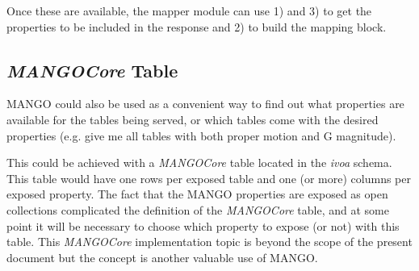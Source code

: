 Once these are available, the mapper module can use 1) and 3) to get the properties to be included 
in the response and 2) to build the mapping block. 

\subsection{ \emph{MANGOCore} Table}

MANGO could also be used as a convenient way to find out what properties are available for the tables being served,
or which tables come with the desired properties (e.g. give me all tables with both proper motion and G magnitude).

This could be achieved with a \emph{MANGOCore} table located in the \emph{ivoa} schema. 
This table would have one rows per exposed table and one (or more) columns per exposed property.
The fact that the MANGO properties are exposed as open collections complicated the definition 
of the \emph{MANGOCore} table, and at some point it will be necessary to choose which property 
to expose (or not) with this table.
This \emph{MANGOCore} implementation topic is beyond the scope of the present document but the concept
is another valuable use of MANGO.  



